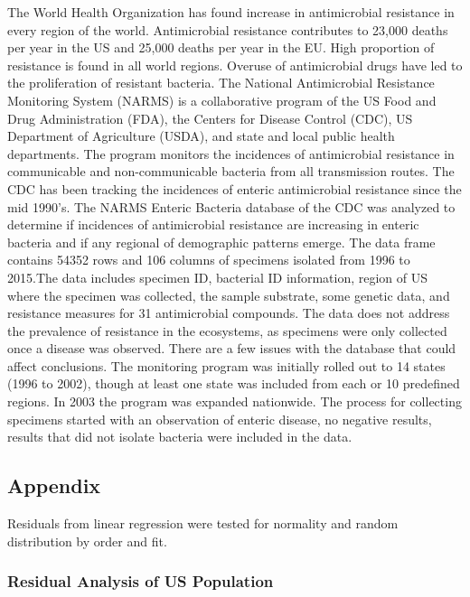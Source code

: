 \documentclass[11pt]{article}
\begin{document}
    The World Health Organization has found increase in antimicrobial
resistance in every region of the world. Antimicrobial resistance
contributes to 23,000 deaths per year in the US and 25,000 deaths per
year in the EU. High proportion of resistance is found in all world
regions. Overuse of antimicrobial drugs have led to the proliferation of
resistant bacteria. The National Antimicrobial Resistance Monitoring
System (NARMS) is a collaborative program of the US Food and Drug
Administration (FDA), the Centers for Disease Control (CDC), US
Department of Agriculture (USDA), and state and local public health
departments. The program monitors the incidences of antimicrobial
resistance in communicable and non-communicable bacteria from all
transmission routes. The CDC has been tracking the incidences of enteric
antimicrobial resistance since the mid 1990's. The NARMS Enteric
Bacteria database of the CDC was analyzed to determine if incidences of
antimicrobial resistance are increasing in enteric bacteria and if any
regional of demographic patterns emerge. The data frame contains 54352
rows and 106 columns of specimens isolated from 1996 to 2015.The data
includes specimen ID, bacterial ID information, region of US where the
specimen was collected, the sample substrate, some genetic data, and
resistance measures for 31 antimicrobial compounds. The data does not
address the prevalence of resistance in the ecosystems, as specimens
were only collected once a disease was observed. There are a few issues
with the database that could affect conclusions. The monitoring program
was initially rolled out to 14 states (1996 to 2002), though at least
one state was included from each or 10 predefined regions. In 2003 the
program was expanded nationwide. The process for collecting specimens
started with an observation of enteric disease, no negative results,
results that did not isolate bacteria were included in the data.

    \hypertarget{appendix}{%
\subsection{Appendix}\label{appendix}}

    Residuals from linear regression were tested for normality and random
distribution by order and fit.

    \hypertarget{residual-analysis-of-us-population}{%
\subsubsection{Residual Analysis of US
Population}\label{residual-analysis-of-us-population}}
\end{document}
